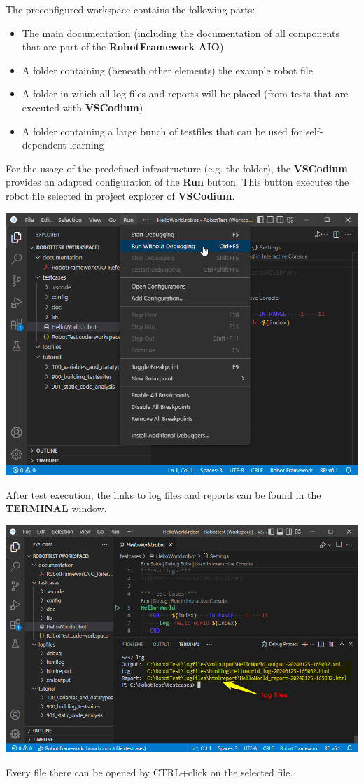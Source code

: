 The preconfigured workspace contains the following parts:

\begin{itemize}
   \item The main documentation  (including the documentation of all components that are part of the \textbf{RobotFramework AIO})
   \item A  folder containing (beneath other elements) the  example robot file 
   \item A  folder in which all log files and reports will be placed (from tests that are executed with \textbf{VSCodium})
   \item A  folder containing a large bunch of testfiles that can be used for self-dependent learning
\end{itemize}

\newpage

For the usage of the predefined infrastructure (e.g. the  folder), the \textbf{VSCodium} provides an adapted configuration of the \textbf{Run} button.
This button executes the robot file selected in project explorer of \textbf{VSCodium}.

\includegraphics[scale=0.7]{./include/graphics/installation/RunButton.png}

After test execution, the links to log files and reports can be found in the \textbf{TERMINAL} window.

\includegraphics[scale=0.7]{./include/graphics/installation/TestResults.png}

Every file there can be opened by CTRL+click on the selected file.


